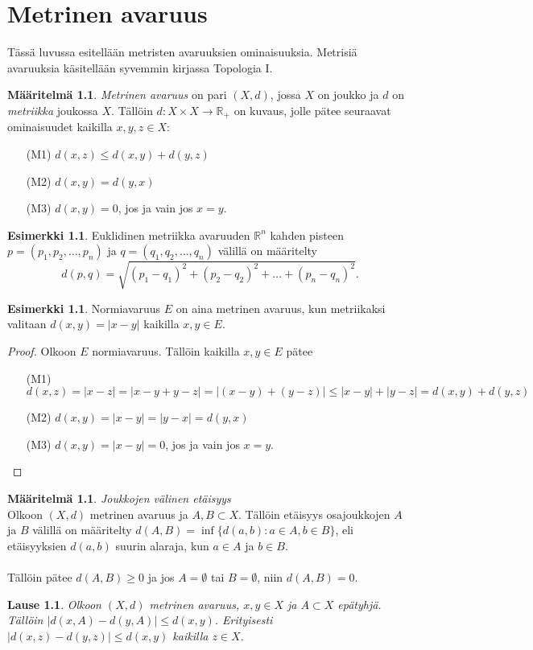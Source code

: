 \documentclass[12pt,a4paper,leqno]{report}
\newcommand{\R}{\mathbb{R}}
\theoremstyle{plain}
\newtheorem{lause}[equation]{Lause}
\theoremstyle{definition}
\newtheorem{maar}[equation]{Määritelmä}
\newtheorem{esim}[equation]{Esimerkki}
\theoremstyle{remark}
\begin{document}
\chapter{Metrinen avaruus}\label{metrinen}
Tässä luvussa esitellään metristen avaruuksien ominaisuuksia. Metrisiä avaruuksia käsitellään syvemmin kirjassa Topologia I.%
\begin{maar} \emph{Metrinen avaruus} 
on pari $(X,d)$, jossa $X$ on joukko ja $d$ on \emph{metriikka} joukossa $X$.
Tällöin $d\colon X\times X\rightarrow \R_+$ on kuvaus, jolle pätee seuraavat ominaisuudet kaikilla $x,y,z\in X$:
\begin{itemize}
\item[(M1)]$d(x,z)\leq d(x,y)+d(y,z)$
\item[(M2)]$d(x,y)=d(y,x)$
\item[(M3)]$d(x,y)=0$, jos ja vain jos $x=y$.
\end{itemize} 
\end{maar} 

\begin{esim}
Euklidinen metriikka avaruuden $\R^n$ kahden pisteen $p=(p_1,p_2,\dots,p_n)$ ja $q=(q_1,q_2,\dots,q_n)$ välillä on määritelty 
$$d(p,q)=\sqrt{(p_1-q_1)^2+(p_2-q_2)^2+\dots+(p_n-q_n)^2}.$$
\end{esim}

\begin{esim}
Normiavaruus $E$ on aina metrinen avaruus, kun metriikaksi valitaan $d(x,y)=|x-y|$ kaikilla $x,y\in E$. 

\begin{proof}
Olkoon $E$ normiavaruus. 
Tällöin kaikilla $x,y\in E$ pätee
\begin{itemize}
\item[(M1)]%
$d(x,z)=|x-z|=|x-y+y-z|=|(x-y)+(y-z)|\leq|x-y|+|y-z|=d(x,y)+d(y,z)$
\item[(M2)]$d(x,y)=|x-y|=|y-x|=d(y,x)$
\item[(M3)]$d(x,y)=|x-y|=0$, jos ja vain jos $x=y$.
\end{itemize}
\end{proof}

\end{esim}
\begin{maar}\emph{Joukkojen välinen etäisyys}\\
Olkoon $(X,d)$ metrinen avaruus ja $A,B\subset X$. Tällöin etäisyys osajoukkojen $A$ ja $B$ välillä on määritelty $d(A,B)=\inf\{d(a,b)\colon a\in A, b\in B\}$, eli etäisyyksien $d(a,b)$ suurin alaraja, kun $a\in A$ ja $b\in B$. \\
\\
Tällöin pätee $d(A,B)\geq 0$ ja jos $A= \emptyset$ tai $B= \emptyset$, niin $d(A,B)= 0$. 

\end{maar}
\begin{lause}
Olkoon $(X,d)$ metrinen avaruus, $x,y\in X$ ja $A\subset X$ epätyhjä. Tällöin $|d(x,A)-d(y,A)|\leq d(x,y)$. Erityisesti $|d(x,z)-d(y,z)|\leq d(x,y)$ kaikilla $z\in X$.
\end{lause}
\end{document}
